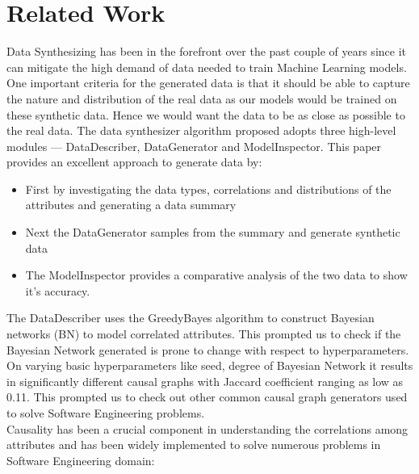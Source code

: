 \documentclass[sigconf,review,anonymous,nonacm=true]{acmart}
\begin{document}
\section{Related Work}
Data Synthesizing has been in the forefront over the past couple of years since it can mitigate the high demand of data needed to train Machine Learning models. One important criteria for the generated data is that it should be able to capture the nature and distribution of the real data as our models would be trained on these synthetic data. Hence we would want the data to be as close as possible to the real data. The data synthesizer algorithm\cite{DS} proposed adopts three high-level modules — DataDescriber, DataGenerator and ModelInspector. This paper provides an excellent approach to generate data by:
\begin{itemize}
    \item First by investigating the data types, correlations and distributions of the attributes and generating a data summary
    \item Next the DataGenerator samples from the summary and generate synthetic data
    \item The ModelInspector provides a comparative analysis of the two data to show it's accuracy.
\end{itemize}The DataDescriber uses the GreedyBayes algorithm to construct Bayesian networks (BN) to model correlated attributes. This prompted us to check if the Bayesian Network generated is prone to change with respect to hyperparameters. On varying basic hyperparameters like seed, degree of Bayesian Network it results in significantly different causal graphs with Jaccard coefficient ranging as low as 0.11. This prompted us to check out other common causal graph generators used to solve Software Engineering problems.\\
Causality has been a crucial component in understanding the correlations among attributes and has been widely implemented to solve numerous problems in Software Engineering domain:
\end{document}
